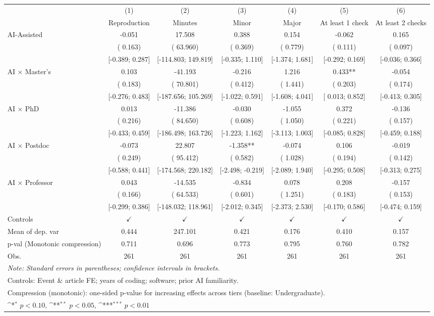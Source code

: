 \def\sym#1{\ifmmode^{#1}\else\(^{#1}\)\fi}
\begin{tabular}{l*{6}{c}}
\hline\hline
 & (1) & (2) & (3) & (4) & (5) & (6)
\\
 & Reproduction & Minutes & Minor & Major & At least 1 check & At least 2 checks
 \\
\hline
AI-Assisted & -0.051 &  17.508 &  0.388 &  0.154 & -0.062 &  0.165
\\
 & ( 0.163) & ( 63.960) & ( 0.369) & ( 0.779) & ( 0.111) & ( 0.097)
\\
 & [-0.389;  0.287] & [-114.803;  149.819] & [-0.335;  1.110] & [-1.374;  1.681] & [-0.292;  0.169] & [-0.036;  0.366]
\\
AI × Master's &  0.103 & -41.193 & -0.216 &  1.216 &  0.433** & -0.054
\\
 & ( 0.183) & ( 70.801) & ( 0.412) & ( 1.441) & ( 0.203) & ( 0.174)
\\
 & [-0.276;  0.483] & [-187.656;  105.269] & [-1.022;  0.591] & [-1.608;  4.041] & [ 0.013;  0.852] & [-0.413;  0.305]
\\
AI × PhD &  0.013 & -11.386 & -0.030 & -1.055 &  0.372 & -0.136
\\
 & ( 0.216) & ( 84.650) & ( 0.608) & ( 1.050) & ( 0.221) & ( 0.157)
\\
 & [-0.433;  0.459] & [-186.498;  163.726] & [-1.223;  1.162] & [-3.113;  1.003] & [-0.085;  0.828] & [-0.459;  0.188]
\\
AI × Postdoc & -0.073 &  22.807 & -1.358** & -0.074 &  0.106 & -0.019
\\
 & ( 0.249) & ( 95.412) & ( 0.582) & ( 1.028) & ( 0.194) & ( 0.142)
\\
 & [-0.588;  0.441] & [-174.568;  220.182] & [-2.498; -0.219] & [-2.089;  1.940] & [-0.295;  0.508] & [-0.313;  0.275]
\\
AI × Professor &  0.043 & -14.535 & -0.834 &  0.078 &  0.208 & -0.157
\\
 & ( 0.166) & ( 64.533) & ( 0.601) & ( 1.251) & ( 0.183) & ( 0.153)
\\
 & [-0.299;  0.386] & [-148.032;  118.961] & [-2.012;  0.345] & [-2.373;  2.530] & [-0.170;  0.586] & [-0.474;  0.159]
\\
\hline
Controls & $\checkmark$ & $\checkmark$ & $\checkmark$ & $\checkmark$ & $\checkmark$ & $\checkmark$
\\
Mean of dep. var &  0.444 &  247.101 &  0.421 &  0.176 &  0.410 &  0.157
\\
p-val (Monotonic compression) &  0.711 &  0.696 &  0.773 &  0.795 &  0.760 &  0.782
\\
Obs. & 261 & 261 & 261 & 261 & 261 & 261
\\
\hline
\hline\hline
\multicolumn{7}{l}{\it{Note:} Standard errors in parentheses; confidence intervals in brackets.}\\
\multicolumn{7}{l}{Controls: Event \& article FE; years of coding; software; prior AI familiarity.}\\
\multicolumn{7}{l}{Compression (monotonic): one-sided p-value for increasing effects across tiers (baseline: Undergraduate).}\\
\multicolumn{7}{l}{\sym{*} $p<0.10$, \sym{**} $p<0.05$,  \sym{***} $p<0.01$}\\
\end{tabular}

